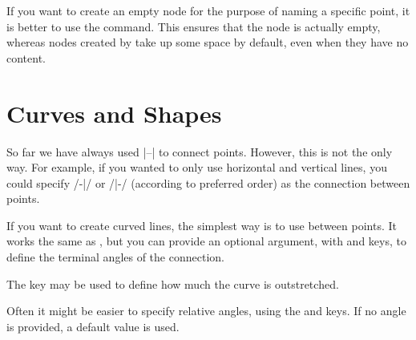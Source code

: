 If you want to create an empty node for the purpose of naming a specific point,
it is better to use the  command. This
ensures that the node is actually empty, whereas nodes created by 
take up some space by default, even when they have no content.
\begin{example}
\end{example}

\section{Curves and Shapes}

So far we have always used \ltx|--| to connect points. However,
this is not the only way. For example, if you wanted to only use horizontal and
vertical lines, you could specify \ltx/-|/ or \ltx/|-/ (according to preferred
order) as the connection between points.
\begin{example}
\end{example}

If you want to create curved lines, the simplest way is to use 
between points. It works the same as \ltx{--}, but you can provide an optional
argument, with  and  keys, to define the terminal angles of
the connection.
\begin{example}[vertical_mode, examplewidth=0.8\linewidth]
\tikzset{baseline} \vspace{-0.3cm} %
\vspace{-0.5cm} %
\end{example}
The  key may be used to define how much the curve is
outstretched.
\begin{example}[vertical_mode, examplewidth=0.8\linewidth]
\tikzset{baseline} \vspace{-1cm} %
\vspace{-1cm} %
\end{example}
Often it might be easier to specify relative angles, using the  and  keys. If no angle is provided, a default value is
used.
\begin{example}[vertical_mode, examplewidth=0.8\linewidth]
\end{example}

